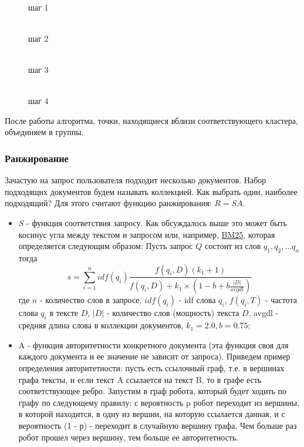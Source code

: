 \begin {itemize}
\begin{figure}[h]
\begin{minipage}[h]{0.47\linewidth}
\center{\texttt{[image: 13/1]}}  \\ шаг 1
\end{minipage}
\hfill
\begin{minipage}[h]{0.47\linewidth}
\center{\texttt{[image: 13/2]}} \\ шаг 2
\end{minipage}
\vfill
\begin{minipage}[h]{0.47\linewidth}
\center{\texttt{[image: 13/3]}} \\ шаг 3
\end{minipage}
\hfill
\begin{minipage}[h]{0.47\linewidth}
\center{\texttt{[image: 13/4]}} \\ шаг 4
\end{minipage}
\end{figure} 

После работы алгоритма, точки, находящиеся вблизи соответствующего кластера, объединяем в группы.
\end{itemize}

\subsubsection {Ранжирование}
Зачастую на запрос пользователя подходит несколько документов. Набор подходящих документов будем называть коллекцией. Как выбрать один, наиболее подходящий? Для этого считают функцию ранжирования: $R = S A$.
\begin{itemize}
\item $S$ - функция соответствия запросу. Как обсуждалось выше это может быть косинус угла между текстом и запросом или, например, \href{https://clck.ru/pvLYk}{BM25}, которая определяется следующим образом: Пусть запрос $Q$ состоит из слов $q_1, q_2, \dots q_n$ тогда $$ s = \sum_{i = 1}^n idf (q_i)
 \frac {f(q_i, D)(k_1 + 1)}{f(q_i, D) + k_1 \times \left(1 - b + b \frac{|D|}{avgdl} \right)} $$ где $n$ - количество слов в запросе, $idf(q_i)$ - idf слова $q_i$, $f(q_i, T)$ - частота слова $q_i$ в тексте $D$, $|D|$ - количество слов (мощность) текста $D$, avgdl - средняя длина слова в коллекции документов, $k_1 = 2.0, b = 0.75$;
\item A - функция авторитетности конкретного документа (эта функция своя для каждого документа и ее значение не зависит от запроса). Приведем пример определения авторитетности: пусть есть ссылочный граф, т.е. в вершинах графа тексты, и если текст A ссылается на текст B, то в графе есть соответствующее ребро. Запустим в граф робота, который будет ходить по графу по следующему правилу: с вероятность p робот переходит из вершины, в которой находится, в одну из вершин, на которую ссылается данная, и с вероятность (1 - р) - переходит в случайную вершину графа. Чем больше раз робот прошел через вершину, тем больше ее авторитетность.
\end {itemize}



